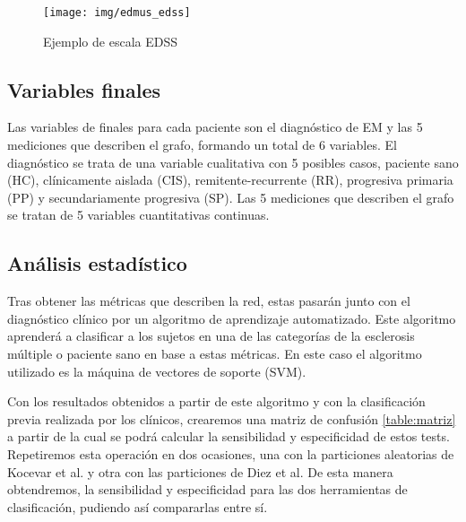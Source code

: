 \documentclass[fleqn,12pt]{UICArticle} %
\begin{document}
\begin{figure}[b]
	\centering
	\texttt{[image: img/edmus\_edss]}
	\vspace{5mm} 
	\caption{Ejemplo de escala EDSS}
	\label{fig:edss}
\end{figure}

\subsection{Variables finales}

Las variables de finales para cada paciente son el diagnóstico de EM y las 5 mediciones que describen el grafo, formando un total de 6 variables. El diagnóstico se trata de una variable cualitativa con 5 posibles casos, paciente sano (HC), clínicamente aislada (CIS), remitente-recurrente (RR), progresiva primaria (PP) y secundariamente progresiva (SP). Las 5 mediciones que describen el grafo se tratan de 5 variables cuantitativas continuas.

\subsection{Análisis estadístico}
Tras obtener las métricas que describen la red, estas pasarán junto con el diagnóstico clínico por un algoritmo de aprendizaje automatizado. Este algoritmo aprenderá a clasificar a los sujetos en una de las categorías de la esclerosis múltiple o paciente sano en base a estas métricas. En este caso el algoritmo utilizado es la máquina de vectores de soporte (SVM).

Con los resultados obtenidos a partir de este algoritmo y con la clasificación previa realizada por los clínicos, crearemos una matriz de confusión \ref{table:matriz} a partir de la cual se podrá calcular la sensibilidad y especificidad de estos tests. Repetiremos esta operación en dos ocasiones, una con la particiones aleatorias de Kocevar et al. y otra con las particiones de Diez et al. De esta manera obtendremos, la sensibilidad y especificidad para las dos herramientas de clasificación, pudiendo así compararlas entre sí. 
\end{document}

